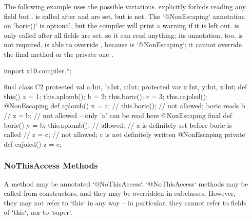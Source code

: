 The following example uses the possible variations.   
explicitly forbids reading any field but
.  is called after  and  are set, but
 is not.
The \xcd`@NonEscaping` annotation on \xcd`boric()` is optional, but the
compiler will print a warning if it is left out.
 is only called after all fields are set, so it
can read anything; its annotation, too, is not required.    is able to override , because
 is \xcd`@NonEscaping`; it cannot override the final method
 or the private one .  
\begin{xten}
import x10.compiler.*;

final class C2 {
  protected val a:Int, b:Int, c:Int;
  protected var x:Int, y:Int, z:Int;
  def this() {
    a = 1;
    this.aplomb();
    b = 2;
    this.boric();
    c = 3;
    this.cajoled();
  }
  @NonEscaping def aplomb() {
    x = a;
    // this.boric(); // not allowed; boric reads b.
    // z = b; // not allowed -- only 'a' can be read here
  }
  @NonEscaping final def boric() {
    y = b;
    this.aplomb(); // allowed; 
       // a is definitely set before boric is called
    // z = c; // not allowed; c is not definitely written
  }
  @NonEscaping private def cajoled() {
    z = c;
  }
}

\end{xten}
%

\subsubsection{NoThisAccess Methods}

A method may be annotated \xcd`@NoThisAccess`.  \xcd`@NoThisAccess` methods
may be called from constructors, and they may be overridden in subclasses.
However, they may not refer to \xcd`this` in any way -- in particular, they
cannot refer to fields of \xcd`this`, nor to \xcd`super`.

